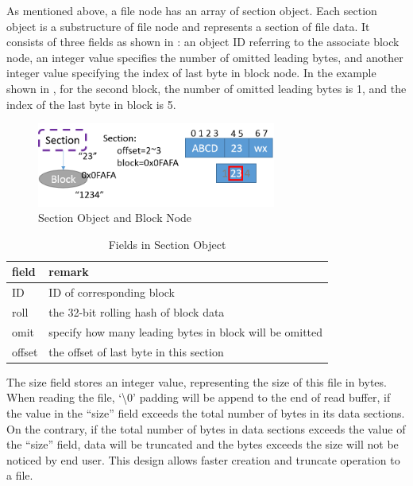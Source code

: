     As mentioned above, a file node has an array of section object. Each section object is a substructure of file node and represents a section of file data. It consists of three fields as shown in : an object ID referring to the associate block node, an integer value specifies the number of omitted leading bytes, and another integer value specifying the index of last byte in block node. In the example shown in , for the second block, the number of omitted leading bytes is 1, and the index of the last byte in block is 5.

\begin{figure}[t]
\centering
\includegraphics[width=0.7\textwidth]{Chapter-3/figs/fig9.png}
\caption{Section Object and Block Node}
\label{fig:section_and_block}
\end{figure}

\begin{table}[t]
\begin{center}
\begin{tabular}{ll}
\toprule
field & remark\\
\midrule
ID & ID of corresponding block\\
roll & the 32-bit rolling hash of block data\\
omit & specify how many leading bytes in block will be omitted\\
offset & the offset of last byte in this section\\
\bottomrule
\end{tabular}
\end{center}
\caption{Fields in Section Object}
\label{tab:section_fields}
\end{table}

    The size field stores an integer value, representing the size of this file in bytes. When reading the file, `\textbackslash0' padding will be append to the end of read buffer, if the value in the ``size'' field exceeds the total number of bytes in its data sections. On the contrary, if the total number of bytes in data sections exceeds the value of the ``size'' field, data will be truncated and the bytes exceeds the size will not be noticed by end user. This design allows faster creation and truncate operation to a file.

